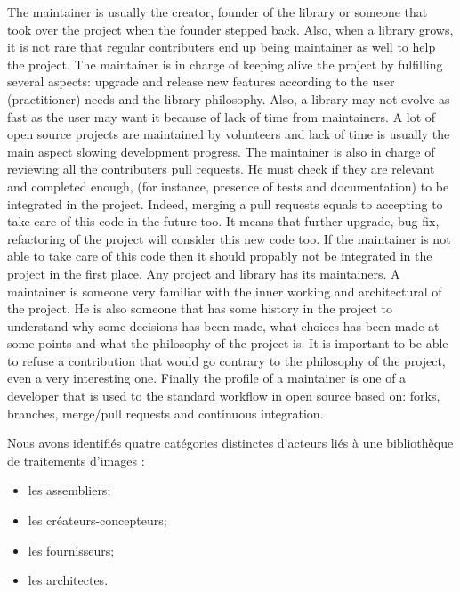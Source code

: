 The maintainer is usually the creator, founder of the library or someone that took over the project when the founder
stepped back. Also, when a library grows, it is not rare that regular contributers end up being maintainer as well to
help the project. The maintainer is in charge of keeping alive the project by fulfilling several aspects: upgrade and
release new features according to the user (practitioner) needs and the library philosophy. Also, a library may not
evolve as fast as the user may want it because of lack of time from maintainers. A lot of open source projects are
maintained by volunteers and lack of time is usually the main aspect slowing development progress. The maintainer is
also in charge of reviewing all the contributers pull requests. He must check if they are relevant and completed enough,
(for instance, presence of tests and documentation) to be integrated in the project. Indeed, merging a pull requests
equals to accepting to take care of this code in the future too. It means that further upgrade, bug fix, refactoring of
the project will consider this new code too. If the maintainer is not able to take care of this code then it should
propably not be integrated in the project in the first place. Any project and library has its maintainers. A maintainer
is someone very familiar with the inner working and architectural of the project. He is also someone that has some
history in the project to understand why some decisions has been made, what choices has been made at some points and
what the philosophy of the project is. It is important to be able to refuse a contribution that would go contrary to the
philosophy of the project, even a very interesting one. Finally the profile of a maintainer is one of a developer that
is used to the standard workflow in open source based on: forks, branches, merge/pull requests and continuous
integration.




Nous avons identifiés quatre catégories distinctes d'acteurs liés à une bibliothèque de traitements
d'images :
\begin{itemize}
  \item les assembliers;
  \item les créateurs-concepteurs;
  \item les fournisseurs;
  \item les architectes.
\end{itemize}
